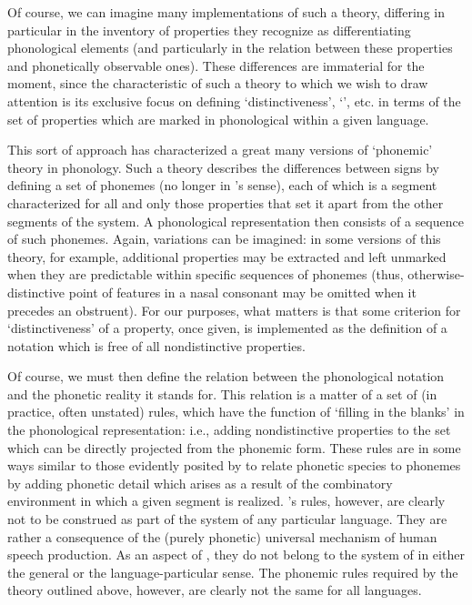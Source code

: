 Of course, we can imagine many implementations of such a theory,
differing in particular in the inventory of properties they recognize
as differentiating phonological elements (and particularly in the
relation between these properties and phonetically observable
ones). These differences are immaterial for the moment, since the
characteristic of such a theory to which we wish to draw attention is
its exclusive focus on defining `distinctiveness', `', etc. in
terms of the set of properties which are marked in phonological
 within a given language.

This sort of approach has characterized a great many versions of
`phonemic' theory in phonology. Such a theory describes the
differences between signs by defining a set of phonemes (no longer in
{\Saussure}'s sense), each of which is a segment characterized for all
and only those properties that set it apart from the other segments of
the system. A phonological representation then consists of a sequence
of such phonemes. Again, variations can be imagined: in some versions
of this theory, for example, additional properties may be extracted
and left unmarked when they are predictable within specific sequences
of phonemes (thus, otherwise-distinctive point of 
features in a {nasal consonant} may be omitted when it precedes an
obstruent). For our purposes, what matters is that some criterion for
`distinctiveness' of a property, once given, is implemented as the
definition of a notation which is free of all nondistinctive
properties.

Of course, we must then define the relation between the phonological
notation and the phonetic reality it stands for. This relation is a
matter of a set of (in practice, often unstated) {rules}, which have the
function of `filling in the blanks' in the phonological
representation: i.e., adding nondistinctive properties to the set
which can be directly projected from the phonemic form. These {rules}
are in some ways similar to those evidently posited by {\Saussure} to
relate phonetic species to phonemes by adding phonetic detail which
arises as a result of the combinatory environment in which a given
segment is realized. {\Saussure}'s {rules}, however, are clearly not to be
construed as part of the system of any particular language. They are
rather a consequence of the (purely phonetic) universal {mechanism} of
human speech production. As an aspect of \emph{}, they do not
belong to the system of \emph{} in either the general or the
language-particular sense. The phonemic {rules} required by the theory
outlined above, however, are clearly not the same for all languages.

